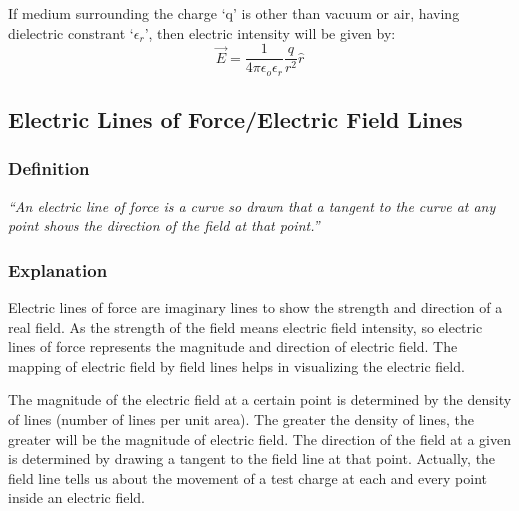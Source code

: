 If medium surrounding the charge ‘q’ is other than vacuum or air,
having dielectric constrant
`$\epsilon_{r}$', then electric intensity will be given by:
\begin{equation}\label{eq:11.16}
  \vec{E} = \frac{1}{4\pi\epsilon_{o}\epsilon_{r}} \frac{q}{r^{2}} \hat{r}
\end{equation}
\subsection{Electric Lines of Force/Electric Field Lines}
\subsubsection{Definition}
\textit{“An electric line of force is a curve so drawn that a tangent to the curve at any point
shows the direction of the field at that point.”}
\subsubsection{Explanation}
Electric lines of force are imaginary lines to show the strength
and direction of a real field. As the strength of the field means
electric field intensity, so electric lines of force represents the
magnitude and direction of electric field. The mapping of electric
field by field lines helps in visualizing the electric field.

The magnitude of the electric field at a certain point is
determined by the density of lines (number of lines per unit area).
The greater the density of lines, the greater will be the magnitude
of electric field. The direction of the field at a given is determined
by drawing a tangent to the field line at that point. Actually,
the field line tells us about the movement of a test charge at
each and every point inside an electric field.
